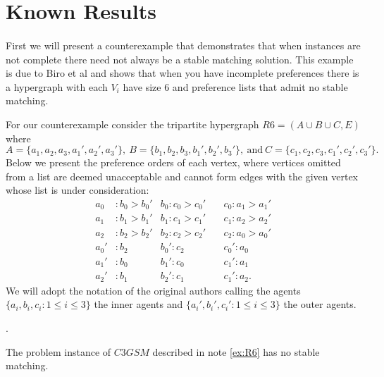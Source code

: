 \section{Known Results}
\paragraph{}
First we will present a counterexample that demonstrates that when instances are not complete there need not always be a stable matching solution. This example is due to Biro et al \cite{biro2010three} and shows that when you have incomplete preferences there is a hypergraph with each $V_i$ have size $6$ and preference lists that admit no stable matching.
\begin{note}\label{ex:R6}
For our counterexample consider the tripartite hypergraph $R6 = (A \cup B \cup C, E)$ where $$A = \{a_1,a_2,a_3,a_1',a_2',a_3'\},\ B = \{b_1,b_2,b_3,b_1',b_2',b_3'\},\ \text{and}\ C = \{c_1,c_2,c_3,c_1',c_2',c_3'\}.$$ Below we present the preference orders of each vertex, where vertices omitted from a list are deemed unacceptable and cannot form edges with the given vertex whose list is under consideration:
\begin{align*}
a_0 &: b_0 > b_0' &b_0: c_0 > c_0' &\ &c_0:a_1 > a_1'\\
a_1 &: b_1 > b_1' &b_1: c_1 > c_1' &\ &c_1:a_2 > a_2'\\
a_2 &: b_2 > b_2' &b_2: c_2 > c_2' &\ &c_2: a_0> a_0'\\
a_0' &: b_2 &b_0': c_2 &\ &c_0':a_0 \\
a_1'&: b_0 &b_1': c_0 &\ &c_1':a_1\\
a_2' &:b_1 &b_2': c_1 &\ & c_1':a_2.
\end{align*}
We will adopt the notation of the original authors calling the agents $\{a_i, b_i, c_i: 1 \leq i \leq 3 \}$ the inner agents and $\{a_i',b_i',c_i': 1\leq i \leq 3\}$ the outer agents.
\end{note}.
\begin{lemma}
The problem instance of $C3GSM$ described in note \ref{ex:R6} has no stable matching.
\end{lemma}
